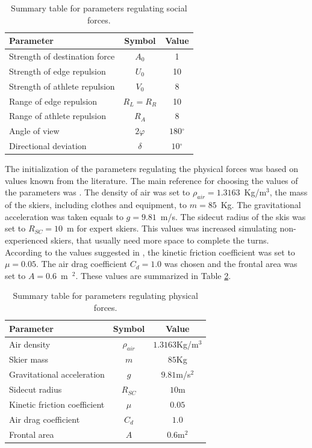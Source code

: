 \documentclass[12pt,a4paper,twoside]{book}
\newcommand{\degree}{\ensuremath{^\circ}}
\begin{document}
\begin{table}
  \centering
  \begin{tabular}{ | l | c | c | }
    \hline
    Parameter & Symbol & Value \\
    \hline
    Strength of destination force & $A_0$ & 1 \\
    Strength of edge repulsion & $U_0$ & 10 \\
    Strength of athlete repulsion & $V_0$ & 8 \\
    Range of edge repulsion & $R_L=R_R$ & 10 \\
    Range of athlete repulsion & $R_A$ & 8 \\
    Angle of view & $2\varphi$ & $180\degree$ \\
    Directional deviation & $\delta$ & $10\degree$ \\
    \hline
  \end{tabular}
  \caption{Summary table for parameters regulating social forces.}
  \label{social_parameters_table}
\end{table}

The initialization of the parameters regulating the physical forces was based on values known from the literature. The main reference for choosing the values of the parameters was \cite{hol2012}. The density of air was set to $\rho_{air}=1.3163 $~Kg/m$^{3}$, the mass of the skiers, including clothes and equipment, to $m=85 $~Kg. The gravitational acceleration was taken equals to $g=9.81 $~m/s. The sidecut radius of the skis was set to $R_{SC}=10 $~m for expert skiers. This values was increased simulating non-experienced skiers, that usually need more space to complete the turns. According to the values suggested in \cite{bu2004}, the kinetic friction coefficient was set to $\mu = 0.05$. The air drag coefficient $C_d = 1.0$ was chosen and the frontal area was set to $A=0.6 $~m~$^2$. These values are summarized in Table \ref{physical_parameters_table}.

\begin{table}
  \centering
  \begin{tabular}{ | l | c | c |}
    \hline
    Parameter & Symbol & Value \\
    \hline
    Air density & $\rho_{air}$ & $1.3163 $Kg/m$^{3}$ \\
    Skier mass & $m$ & $85 $Kg \\
    Gravitational acceleration & $g$ & $9.81 $m/s$^2$ \\
    Sidecut radius & $R_{SC}$ & $10$m \\
    Kinetic friction coefficient & $\mu$ & $0.05$ \\
    Air drag coefficient & $C_d$ & $1.0$ \\
    Frontal area & $A$ & $0.6 $m$^2$ \\
    \hline
  \end{tabular}
  \caption{Summary table for parameters regulating physical forces.}
  \label{physical_parameters_table}
\end{table}
\end{document}
